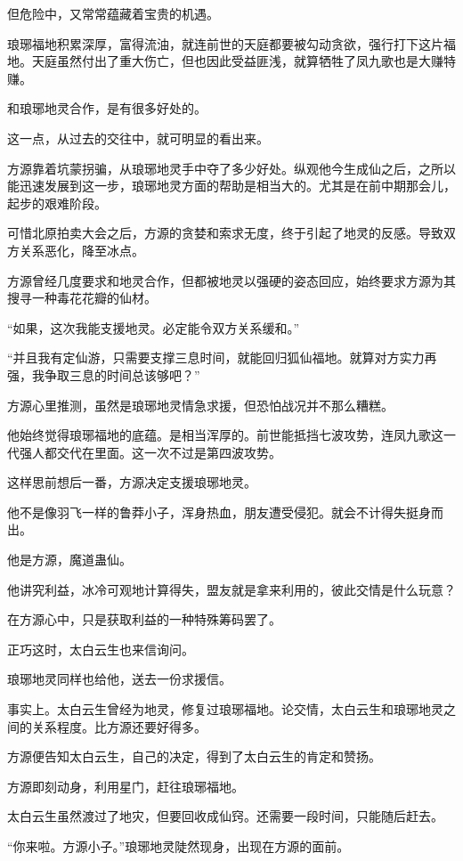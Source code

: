 \begin{this_body}
但危险中，又常常蕴藏着宝贵的机遇。

琅琊福地积累深厚，富得流油，就连前世的天庭都要被勾动贪欲，强行打下这片福地。天庭虽然付出了重大伤亡，但也因此受益匪浅，就算牺牲了凤九歌也是大赚特赚。

和琅琊地灵合作，是有很多好处的。

这一点，从过去的交往中，就可明显的看出来。

方源靠着坑蒙拐骗，从琅琊地灵手中夺了多少好处。纵观他今生成仙之后，之所以能迅速发展到这一步，琅琊地灵方面的帮助是相当大的。尤其是在前中期那会儿，起步的艰难阶段。

可惜北原拍卖大会之后，方源的贪婪和索求无度，终于引起了地灵的反感。导致双方关系恶化，降至冰点。

方源曾经几度要求和地灵合作，但都被地灵以强硬的姿态回应，始终要求方源为其搜寻一种毒花花瓣的仙材。

“如果，这次我能支援地灵。必定能令双方关系缓和。”

“并且我有定仙游，只需要支撑三息时间，就能回归狐仙福地。就算对方实力再强，我争取三息的时间总该够吧？”

方源心里推测，虽然是琅琊地灵情急求援，但恐怕战况并不那么糟糕。

他始终觉得琅琊福地的底蕴。是相当浑厚的。前世能抵挡七波攻势，连凤九歌这一代强人都交代在里面。这一次不过是第四波攻势。

这样思前想后一番，方源决定支援琅琊地灵。

他不是像羽飞一样的鲁莽小子，浑身热血，朋友遭受侵犯。就会不计得失挺身而出。

他是方源，魔道蛊仙。

他讲究利益，冰冷可观地计算得失，盟友就是拿来利用的，彼此交情是什么玩意？

在方源心中，只是获取利益的一种特殊筹码罢了。

正巧这时，太白云生也来信询问。

琅琊地灵同样也给他，送去一份求援信。

事实上。太白云生曾经为地灵，修复过琅琊福地。论交情，太白云生和琅琊地灵之间的关系程度。比方源还要好得多。

方源便告知太白云生，自己的决定，得到了太白云生的肯定和赞扬。

方源即刻动身，利用星门，赶往琅琊福地。

太白云生虽然渡过了地灾，但要回收成仙窍。还需要一段时间，只能随后赶去。

“你来啦。方源小子。”琅琊地灵陡然现身，出现在方源的面前。


\end{this_body}
